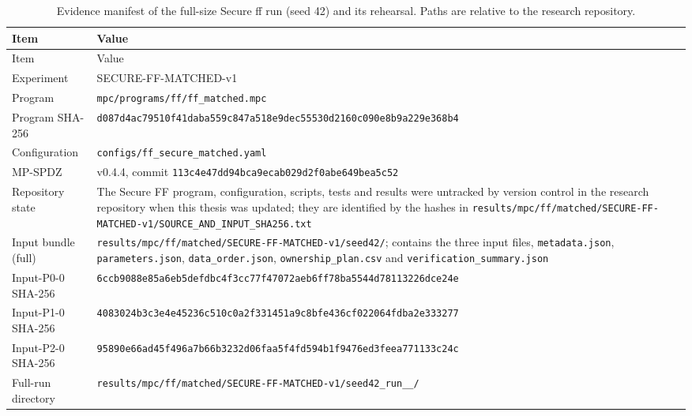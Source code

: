 {\small
\begin{longtable}{@{}>{\raggedright\arraybackslash}p{3.8cm}>{\raggedright\arraybackslash}p{10.0cm}@{}}
\caption{Evidence manifest of the full-size Secure \ac{ff} run (seed 42) and its rehearsal. Paths are relative to the research repository.}\label{tab:app-manifest-ff}\\
\toprule
Item & Value \\
\midrule
\endfirsthead
\toprule
Item & Value \\
\midrule
\endhead
Experiment & SECURE-FF-MATCHED-v1 \\
Program & \texttt{mpc/\allowbreak programs/\allowbreak ff/\allowbreak ff\_\allowbreak matched.mpc} \\
Program SHA-256 & \texttt{d087d4ac79510f41\allowbreak daba559c847a518e\allowbreak 9dec55530d2160c0\allowbreak 90e8b9a229e368b4} \\
Configuration & \texttt{configs/\allowbreak ff\_\allowbreak secure\_\allowbreak matched.yaml} \\
MP-SPDZ & v0.4.4, commit \texttt{113c4e47dd94bca9\allowbreak ecab029d2f0abe64\allowbreak 9bea5c52} \\
Repository state & The Secure FF program, configuration, scripts, tests and results were untracked by version control in the research repository when this thesis was updated; they are identified by the hashes in \texttt{results/\allowbreak mpc/\allowbreak ff/\allowbreak matched/\allowbreak SECURE-FF-MATCHED-v1/\allowbreak SOURCE\_AND\_INPUT\_SHA256.txt} \\
Input bundle (full) & \texttt{results/\allowbreak mpc/\allowbreak ff/\allowbreak matched/\allowbreak SECURE-FF-MATCHED-v1/\allowbreak seed42/}; contains the three input files, \texttt{metadata.json}, \texttt{parameters.json}, \texttt{data\_order.json}, \texttt{ownership\_plan.csv} and \texttt{verification\_summary.json} \\
Input-P0-0 SHA-256 & \texttt{6ccb9088e85a6eb5\allowbreak defdbc4f3cc77f47\allowbreak 072aeb6ff78ba554\allowbreak 4d78113226dce24e} \\
Input-P1-0 SHA-256 & \texttt{4083024b3c3e4e45\allowbreak 236c510c0a2f3314\allowbreak 51a9c8bfe436cf02\allowbreak 2064fdba2e333277} \\
Input-P2-0 SHA-256 & \texttt{95890e66ad45f496\allowbreak a7b66b3232d06faa\allowbreak 5f4fd594b1f9476e\allowbreak d3feea771133c24c} \\
Full-run directory & \texttt{results/\allowbreak mpc/\allowbreak ff/\allowbreak matched/\allowbreak SECURE-FF-MATCHED-v1/\allowbreak seed42\_\allowbreak run\_\allowbreak 20261122\_\allowbreak 212319/} \\

\end{longtable}}
